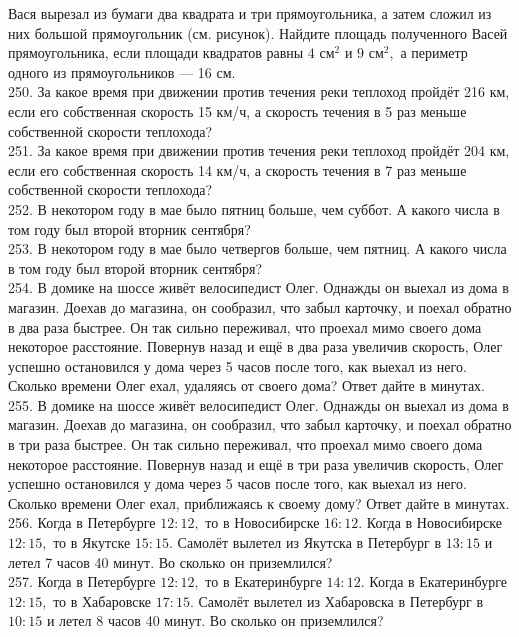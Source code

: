 \documentclass[12pt]{article}
\begin{document}
Вася вырезал из бумаги два квадрата и три прямоугольника, а затем сложил из них большой прямоугольник (см. рисунок). Найдите площадь  полученного Васей прямоугольника, если площади квадратов равны $4\text{ см}^2$ и $9\text{ см}^2,$ а периметр одного из прямоугольников --- 16 см.\\
250. За какое время при движении против течения реки теплоход пройдёт 216 км, если его собственная скорость 15 км/ч, а скорость течения в 5 раз меньше собственной скорости теплохода?\\
251. За какое время при движении против течения реки теплоход пройдёт 204 км, если его собственная скорость 14 км/ч, а скорость течения в 7 раз меньше собственной скорости теплохода?\\
252. В некотором году в мае было пятниц больше, чем суббот. А какого числа в том году был второй вторник сентября?\\
253. В некотором году в мае было четвергов больше, чем пятниц. А какого числа в том году был второй вторник сентября?\\
254. В домике на шоссе живёт велосипедист Олег. Однажды он выехал из дома в магазин. Доехав до магазина, он сообразил, что забыл карточку, и поехал обратно в два раза быстрее. Он так сильно переживал, что проехал мимо своего дома некоторое расстояние. Повернув назад и ещё в два раза увеличив скорость, Олег успешно остановился у дома через 5 часов после того, как выехал из него. Сколько времени Олег ехал, удаляясь от своего дома? Ответ дайте в минутах.\\
255. В домике на шоссе живёт велосипедист Олег. Однажды он выехал из дома в магазин. Доехав до магазина, он сообразил, что забыл карточку, и поехал обратно в три раза быстрее. Он так сильно переживал, что проехал мимо своего дома некоторое расстояние. Повернув назад и ещё в три раза увеличив скорость, Олег успешно остановился у дома через 5 часов после того, как выехал из него. Сколько времени Олег ехал, приближаясь к своему дому? Ответ дайте в минутах.\\
256. Когда в Петербурге $12:12,$ то в Новосибирске $16:12.$ Когда в Новосибирске $12:15,$ то в Якутске $15:15.$ Самолёт вылетел из Якутска в Петербург в $13:15$ и летел 7 часов 40 минут. Во сколько он приземлился?\\
257. Когда в Петербурге $12:12,$ то в Екатеринбурге $14:12.$ Когда в Екатеринбурге $12:15,$ то в Хабаровске $17:15.$ Самолёт вылетел из Хабаровска в Петербург в $10:15$ и летел 8 часов 40 минут. Во сколько он приземлился?\\
\end{document}
